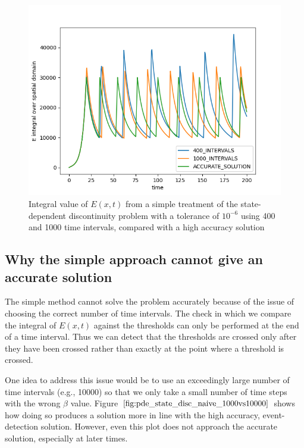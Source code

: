 \begin{figure}[H]
\centering
\includegraphics[width=0.7\linewidth]{./figures/pde_state_disc_naive_400vs1000}
\caption{Integral value of $E(x, t)$ from a simple treatment of the state-dependent discontinuity problem with a tolerance of $10^{-6}$ using 400 and 1000 time intervals, compared with a high accuracy solution}
\label{fig:pde_state_disc_naive_400vs1000}
\end{figure}

\subsection{Why the simple approach cannot give an accurate solution}
\label{subsubsection:pde_state_naive_always_inaccurate}
The simple method cannot solve the problem accurately because of the issue of choosing the correct number of time intervals. The check in which we compare the integral of $E(x, t)$ against the thresholds can only be performed at the end of a time interval. Thus we can detect that the thresholds are crossed only after they have been crossed rather than exactly at the point where a threshold is crossed.

One idea to address this issue would be to use an exceedingly large number of time intervals (e.g., 10000) so that we only take a small number of time steps with the wrong $\beta$ value. Figure $\ref{fig:pde_state_disc_naive_1000vs10000}$ shows how doing so produces a solution more in line with the high accuracy, event-detection solution. However, even this plot does not approach the accurate solution, especially at later times. 

